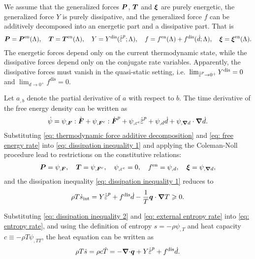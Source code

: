 We assume that the generalized forces $\boldsymbol{P}$, $\boldsymbol{T}$ and $\boldsymbol{\xi}$ are purely energetic, the generalized force $Y$ is purely dissipative, and the generalized force $f$ can be additively decomposed into an energetic part and a dissipative part. That is
\begin{align}
  \bfP = \bfP^\text{en}(\Lambda), \quad \bfT = \bfT^\text{en}(\Lambda), \quad Y = Y^\text{dis}(\epdot; \Lambda), \quad f = f^\text{en}(\Lambda) + f^\text{dis}(\dot{d}; \Lambda), \quad \bs{\xi} = \bs{\xi}^\text{en}(\Lambda). \label{eq: thermodynamic force additive decomposition}
\end{align}
The energetic forces depend only on the current thermodynamic state, while the dissipative forces depend only on the conjugate rate variables. Apparently, the dissipative forces must vanish in the quasi-static setting, i.e.\ $\lim_{\epdot \to 0^+} Y^\text{dis} = 0$ and $\lim_{\dot{d} \to 0^+} f^\text{dis} = 0$.

Let $a_{,b}$ denote the partial derivative of $a$ with respect to $b$. The time derivative of the free energy density can be written as
\begin{align}
  \dot{\psi} = \psi_{, \bfF}:\dot{\bfF} + \psi_{, \bfF^c}:\dot{\defgrad}^p + \psi_{, \varepsilon^c}\epdot + \psi_{, d}\dot{d} + \psi_{, \grad d}\cdot\grad\dot{d}. \label{eq: free energy rate}
\end{align}
Substituting \eqref{eq: thermodynamic force additive decomposition} and \eqref{eq: free energy rate} into \eqref{eq: dissipation inequality 1} and applying the Coleman-Noll procedure lead to restrictions on the constitutive relations:
\begin{align}
  \boldsymbol{P} = \psi_{, \boldsymbol{F}}, \quad \boldsymbol{T} = \psi_{, \boldsymbol{F}^c}, \quad \psi_{, \varepsilon^c} = 0, \quad f^\text{en} = \psi_{, d}, \quad \boldsymbol{\xi} = \psi_{, \boldsymbol{\nabla} d}, \label{eq: constitutive restrictions}
\end{align}
and the dissipation inequality \eqref{eq: dissipation inequality 1} reduces to
\begin{align}
  \rho T \dot{s}_\text{int} = Y\epdot + f^\text{dis}\dot{d} - \dfrac{1}{T}\bfq\cdot\grad T \geqslant 0. \label{eq: dissipation inequality 2}
\end{align}

Substituting \eqref{eq: dissipation inequality 2} and \eqref{eq: external entropy rate} into \eqref{eq: entropy rate}, and using the definition of entropy $s = -\rho\psi_{, T}$ and heat capacity $c \equiv -\rho T \psi_{, TT}$, the heat equation can be written as
\begin{align}
  \rho T \dot{s} = \rho c \dot{T} = - \divergence\bfq + Y\epdot + f^\text{dis}\dot{d}. \label{eq: heat equation}
\end{align}
